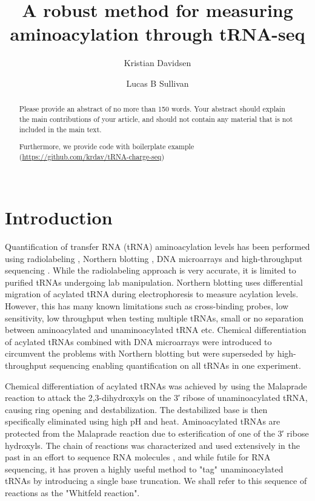 \documentclass[9pt,lineno]{elife}
\title{A robust method for measuring aminoacylation through tRNA-seq}
\author[1,2]{Kristian Davidsen}
\author[1*]{Lucas B Sullivan}
\affil[1]{Fred Hutchinson Cancer Center}
\affil[2]{Molecular and cellular biology program, University of Washington}
\begin{document}
\maketitle

\begin{abstract}
Please provide an abstract of no more than 150 words. Your abstract should explain the main contributions of your article, and should not contain any material that is not included in the main text.

Furthermore, we provide code with boilerplate example (\url{https://github.com/krdav/tRNA-charge-seq}) \\ \ \\
\end{abstract}



\section{Introduction}
Quantification of transfer RNA (tRNA) aminoacylation levels has been performed using radiolabeling \citep{Wolfson2002-gp}, Northern blotting \citep{Ho1987-ug, Varshney1991-zp, Stenum2017-wn}, DNA microarrays \citep{Dittmar2005-va} and high-throughput sequencing \citep{Evans2017-st}.
While the radiolabeling approach is very accurate, it is limited to purified tRNAs undergoing lab manipulation.
Northern blotting uses differential migration of acylated tRNA during electrophoresis to measure acylation levels.
However, this has many known limitations such as cross-binding probes, low sensitivity, low throughput when testing multiple tRNAs, small or no separation between aminoacylated and unaminoacylated tRNA etc.
Chemical differentiation of acylated tRNAs combined with DNA microarrays were introduced to circumvent the problems with Northern blotting but were superseded by high-throughput sequencing enabling quantification on all tRNAs in one experiment.

Chemical differentiation of acylated tRNAs was achieved by using the Malaprade reaction to attack the 2,3-dihydroxyls on the 3′ ribose of unaminoacylated tRNA, causing ring opening and destabilization.
The destabilized base is then specifically eliminated using high pH and heat.
Aminoacylated tRNAs are protected from the Malaprade reaction due to esterification of one of the 3′ ribose hydroxyls.
The chain of reactions was characterized and used extensively in the past in an effort to sequence RNA molecules \citep{Whitfeld1953-ca, Whitfeld1954-wl, Khym1961-xf, Neu1964-hu}, and while futile for RNA sequencing, it has proven a highly useful method to "tag" unaminoacylated tRNAs by introducing a single base truncation.
We shall refer to this sequence of reactions as the "Whitfeld reaction".
\end{document}

